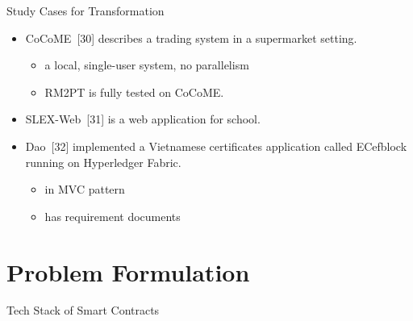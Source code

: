 \documentclass[xcolor=svgnames]{beamer}
\begin{document}
\begin{frame}{Study Cases for Transformation}
\begin{itemize}
\item CoCoME~[30] describes a trading system in a supermarket setting.
	\begin{itemize}
	\item a local, single-user system, no parallelism
	\item RM2PT is fully tested on CoCoME.
	\end{itemize}

\item SLEX-Web~[31] is a web application for school.
\item Dao~[32] implemented a Vietnamese certificates application called ECefblock running on Hyperledger Fabric.
	\begin{itemize}
	\item in MVC pattern
	\item has requirement documents
	\end{itemize}
\end{itemize}
\end{frame}

\section{Problem Formulation}

\begin{frame}{Tech Stack of Smart Contracts}



\end{frame}
\end{document}
